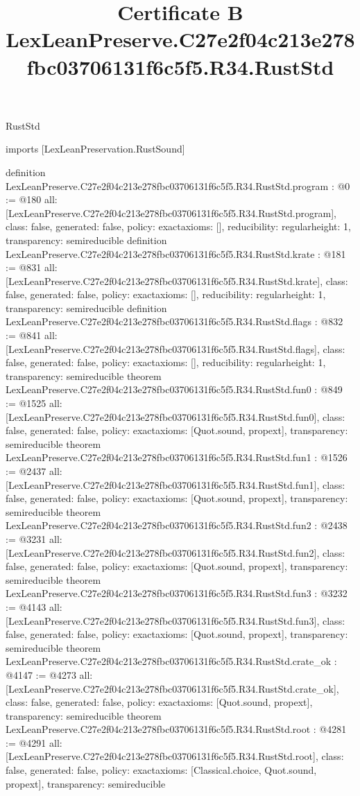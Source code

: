 \begin{lexlean}{RustStd}
\title{Certificate B LexLeanPreserve.C27e2f04c213e278fbc03706131f6c5f5.R34.RustStd}
\begin{coremodule}
imports [LexLeanPreservation.RustSound]

definition LexLeanPreserve.C27e2f04c213e278fbc03706131f6c5f5.R34.RustStd.program : @0 := @180 {
  all: [LexLeanPreserve.C27e2f04c213e278fbc03706131f6c5f5.R34.RustStd.program],
  class: false,
  generated: false,
  policy: exact{axioms: []},
  reducibility: regular{height: 1},
  transparency: semireducible
}
definition LexLeanPreserve.C27e2f04c213e278fbc03706131f6c5f5.R34.RustStd.krate : @181 := @831 {
  all: [LexLeanPreserve.C27e2f04c213e278fbc03706131f6c5f5.R34.RustStd.krate],
  class: false,
  generated: false,
  policy: exact{axioms: []},
  reducibility: regular{height: 1},
  transparency: semireducible
}
definition LexLeanPreserve.C27e2f04c213e278fbc03706131f6c5f5.R34.RustStd.flags : @832 := @841 {
  all: [LexLeanPreserve.C27e2f04c213e278fbc03706131f6c5f5.R34.RustStd.flags],
  class: false,
  generated: false,
  policy: exact{axioms: []},
  reducibility: regular{height: 1},
  transparency: semireducible
}
theorem LexLeanPreserve.C27e2f04c213e278fbc03706131f6c5f5.R34.RustStd.fun0 : @849 := @1525 {
  all: [LexLeanPreserve.C27e2f04c213e278fbc03706131f6c5f5.R34.RustStd.fun0],
  class: false,
  generated: false,
  policy: exact{axioms: [Quot.sound, propext]},
  transparency: semireducible
}
theorem LexLeanPreserve.C27e2f04c213e278fbc03706131f6c5f5.R34.RustStd.fun1 : @1526 := @2437 {
  all: [LexLeanPreserve.C27e2f04c213e278fbc03706131f6c5f5.R34.RustStd.fun1],
  class: false,
  generated: false,
  policy: exact{axioms: [Quot.sound, propext]},
  transparency: semireducible
}
theorem LexLeanPreserve.C27e2f04c213e278fbc03706131f6c5f5.R34.RustStd.fun2 : @2438 := @3231 {
  all: [LexLeanPreserve.C27e2f04c213e278fbc03706131f6c5f5.R34.RustStd.fun2],
  class: false,
  generated: false,
  policy: exact{axioms: [Quot.sound, propext]},
  transparency: semireducible
}
theorem LexLeanPreserve.C27e2f04c213e278fbc03706131f6c5f5.R34.RustStd.fun3 : @3232 := @4143 {
  all: [LexLeanPreserve.C27e2f04c213e278fbc03706131f6c5f5.R34.RustStd.fun3],
  class: false,
  generated: false,
  policy: exact{axioms: [Quot.sound, propext]},
  transparency: semireducible
}
theorem LexLeanPreserve.C27e2f04c213e278fbc03706131f6c5f5.R34.RustStd.crate_ok : @4147 := @4273 {
  all: [LexLeanPreserve.C27e2f04c213e278fbc03706131f6c5f5.R34.RustStd.crate_ok],
  class: false,
  generated: false,
  policy: exact{axioms: [Quot.sound, propext]},
  transparency: semireducible
}
theorem LexLeanPreserve.C27e2f04c213e278fbc03706131f6c5f5.R34.RustStd.root : @4281 := @4291 {
  all: [LexLeanPreserve.C27e2f04c213e278fbc03706131f6c5f5.R34.RustStd.root],
  class: false,
  generated: false,
  policy: exact{axioms: [Classical.choice, Quot.sound, propext]},
  transparency: semireducible
}


\end{coremodule}
\end{lexlean}
